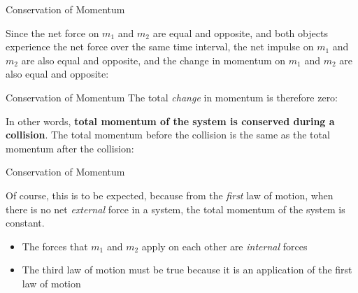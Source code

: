 \documentclass[12pt,compress,aspectratio=169]{beamer}
\begin{document}
\begin{frame}{Conservation of Momentum}
  
  Since the net force on $m_1$ and $m_2$ are equal and opposite, and both
  objects experience the net force over the same time interval, the net
  impulse on $m_1$ and $m_2$ are also equal and opposite, and the change in
  momentum on $m_1$ and $m_2$ are also equal and opposite:

\end{frame}



\begin{frame}{Conservation of Momentum}
  The total \emph{change} in momentum is therefore zero:

    
  In other words, \textbf{total momentum of the system is conserved during a
    collision}. The total momentum before the collision is the same as the
  total momentum after the collision:
    


\end{frame}




\begin{frame}{Conservation of Momentum}
  
  Of course, this is to be expected, because from the \emph{first} law of
  motion, when there is no net \emph{external} force in a system, the total
  momentum of the system is constant.
  \begin{itemize}
  \item The forces that $m_1$ and $m_2$ apply on each other are \emph{internal}
    forces
  \item The third law of motion must be true because it is an application of
    the first law of motion
  \end{itemize}
\end{frame}
\end{document}
